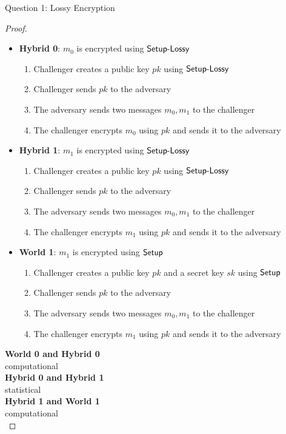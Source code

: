 \begin{solution}{Question 1: Lossy Encryption}
\begin{proof}
\begin{itemize}
        \item \textbf{Hybrid 0}: $m_0$ is encrypted using $\mathsf{Setup\text{-}Lossy}$
        \begin{enumerate}
            \item Challenger creates a public key $pk$ using $\mathsf{Setup\text{-}Lossy}$
            \item Challenger sends $pk$ to the adversary
            \item The adversary sends two messages $m_0, m_1$ to the challenger
            \item The challenger encrypts $m_0$ using $pk$ and sends it to the adversary
        \end{enumerate}
        
        \item \textbf{Hybrid 1}: $m_1$ is encrypted using $\mathsf{Setup\text{-}Lossy}$
        \begin{enumerate}
            \item Challenger creates a public key $pk$ using $\mathsf{Setup\text{-}Lossy}$
            \item Challenger sends $pk$ to the adversary
            \item The adversary sends two messages $m_0, m_1$ to the challenger
            \item The challenger encrypts $m_1$ using $pk$ and sends it to the adversary
        \end{enumerate}

        \item \textbf{World 1}: $m_1$ is encrypted using $\mathsf{Setup}$
        \begin{enumerate}
            \item Challenger creates a public key $pk$ and a secret key $sk$ using $\mathsf{Setup}$
            \item Challenger sends $pk$ to the adversary
            \item The adversary sends two messages $m_0, m_1$ to the challenger
            \item The challenger encrypts $m_1$ using $pk$ and sends it to the adversary
        \end{enumerate}
    \end{itemize}

    \textbf{World 0 and Hybrid 0}\\
    computational\\
    \textbf{Hybrid 0 and Hybrid 1}\\
    statistical \\
    \textbf{Hybrid 1 and World 1}\\
    computational\\
    \end{proof}
\end{solution}
